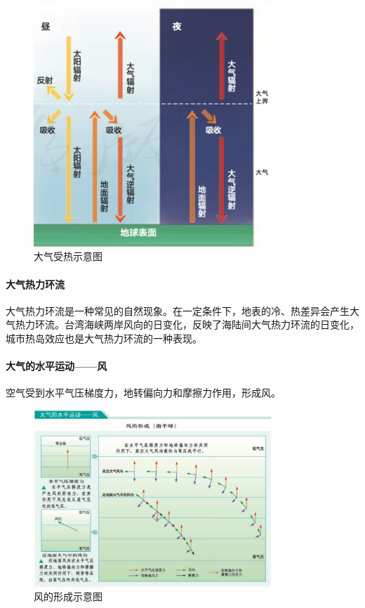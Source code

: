 \begin{figure}[h]
	\centering
	\includegraphics[width=0.8\textwidth]{assets/images/地理知识-01.png}
	\caption{大气受热示意图}
	\label{fig:大气受热}
\end{figure}

\paragraph{大气热力环流}

大气热力环流是一种常见的自然现象。在一定条件下，地表的冷、热差异会产生大气热力环流。台湾海峡两岸风向的日变化，反映了海陆间大气热力环流的日变化，城市热岛效应也是大气热力环流的一种表现。

\paragraph{大气的水平运动——风}

空气受到水平气压梯度力，地转偏向力和摩擦力作用，形成风。

\begin{figure}[h]
	\centering
	\includegraphics[width=0.8\textwidth]{assets/images/地理知识-02.png}
	\caption{风的形成示意图}
	\label{fig:风的形成}
\end{figure}
